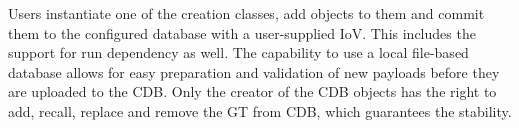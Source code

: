 \begin{comment}
On the users' side, except for just using central database, a local database back-end that takes GT information such as calibration data while uses a local database, such as a customized PID weight file,  is also possible.  It automatically download the needed database files that are required for a BASF2 execution and stores them in a local folder. This means even if the local machine is offline or the CDB is not accessible, one can still run BASF2 as long as the local folder is there. 
\begin{figure}[htbp]
\centering
\texttt{[image: CDB]}
\caption{ Relations of all entities in CDB\cite{BASF2}, showing the management logic from users' end to each CDB files and services. }
\label{fig:CDB}
\end{figure}
\end{comment}
 



\begin{comment}
The management of CBD with the extension of local database gives a good convenience for users to perform their own analysis and share the results with collaborators.
Users' access to conditions objects in the CDB is
provided by two interface classes, one for single objects
called ``DBObjPtr" and one for arrays of objects called
``DBArray". To facilitate easy creation of new conditions data – for example, during calibration – we provide two payload creation classes, ``DBImportObj" and ``DBImportArray". They
have an interface very similar to DBObjPtr and DBArray\cite{BASF2}.
\end{comment}

Users instantiate one of the creation classes, add objects to them and commit them to the configured database with a user-supplied IoV. This includes the support for run dependency as well. The capability to use a local file-based
 database allows for easy preparation and validation of new payloads before they are uploaded to the CDB. Only the creator of the CDB objects has the right to add, recall, replace and remove the GT from CDB, which guarantees the stability.

\begin{comment}
The scheme of this entities and how users interact with CDB object is demonstrated in Figure \ref{fig:CDB}. For example, user can perform their analysis and first locally generate weight files or calibration data based on different run conditions and reconstruction criteria, which are stated by their names of the IoVs. Once the results are good to share, they can create a GT in CDB of which they have the full ownership, add all database files into the GT and open it to Belle II collaboration. Anyone who would like to re-calibrate data or use their weight files for PID and so on, can simply use the built-in function ``basf2.useCentralDB()" in the BASF2 steering file to directly access the corresponding data. However, only the creator of the CDB objects has the right to add, recall, replace and remove the GT, which guarantees the stability of the CDB and responsibilities for each user.

\end{comment}

